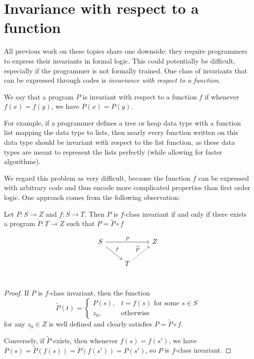 \documentclass{llncs}
\begin{document}
  \section{Invariance with respect to a function}

  All previous work on these topics share one downside: they require programmers
  to express their invariants in formal logic. 
  This could potentially be difficult,
  especially if the programmer is not formally trained.
  One class of invariants that can be expressed through codes is
  \emph{invariance with respect to a function}.

  \begin{definition} We say that a program $P$ is invariant with respect to a
    function $f$ if whenever $f(x)=f(y)$, we have $P(x)=P(y)$.
  \end{definition}

  For example, if a programmer defines a tree or heap data type with a function
  $\mathrm{list}$ mapping the data type to lists,
  then nearly every function written on this data type should be invariant with
  respect to the $\mathrm{list}$ function,
  as these data types are meant to represent the lists perfectly (while allowing
  for faster algorithms).

  We regard this problem as very difficult, because the function $f$ can be
  expressed with arbitrary code and thus encode more complicated properties than
  first order logic. One approach comes from the following observation:

  \begin{lemma} Let $P : S \to Z$ and $f : S \to T$.
    Then $P$ is $f$-class invariant if and only if
    there exists a program $\widetilde{P} : T\to Z$
    such that $P = \widetilde{P} \circ f$
  \end{lemma}
    \[
      \begin{tikzcd}
        S \arrow{rr}{P} \arrow{rd}{f} &   & Z \\
        & T \arrow[dashed]{ru}{\widetilde{P}} &   \\
      \end{tikzcd}
    \]
    \vspace{-0.3in}
  \begin{proof}
    If $P$ is $f$-class invariant, then the function
    \[ \widetilde{P}(t) = \begin{cases}
         P(s), & t = f(s) \text{ for some $s\in S$} \\
         z_0, & \text{otherwise}
       \end{cases}
    \]
    for any $z_0 \in Z$
    is well defined and clearly satisfies $P = \widetilde{P} \circ f$.

    Conversely, if $\widetilde{P}$ exists, then whenever $f(s)=f(s')$,
    we have $P(s) = \widetilde{P}(f(s)) = \widetilde{P}(f(s')) = P(s')$,
    so $P$ is $f$-class invariant.
  \end{proof}
\end{document}
